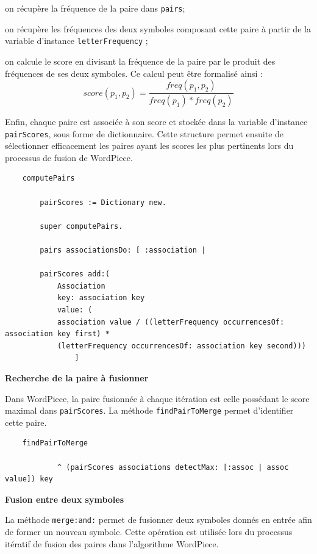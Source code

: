 \documentclass[12pt,a4paper]{report}
\begin{document}
	\begin{itemizeFB}
		\item on récupère la fréquence de la paire dans \texttt{pairs};
		\item on récupère les fréquences des deux symboles composant cette paire à partir de la variable d’instance \texttt{letterFrequency} ;
		\item on calcule le score en divisant la fréquence de la paire par le produit des fréquences de ses deux symboles.
		Ce calcul peut être formalisé ainsi :
		\[
		score(p_1, p_2)=\frac{freq(p_1, p_2)}{freq(p_1) * freq(p_2)}
		\]
	\end{itemizeFB}
	
	Enfin, chaque paire est associée à son score et stockée dans la variable d’instance \texttt{pairScores}, sous forme de dictionnaire. Cette structure permet ensuite de sélectionner efficacement les paires ayant les scores les plus pertinents lors du processus de fusion de WordPiece.
	
	\begin{verbatim}
	computePairs
		
		pairScores := Dictionary new.
				
		super computePairs.
				
		pairs associationsDo: [ :association |
				
		pairScores add:(
			Association 
			key: association key 
			value: (
			association value / ((letterFrequency occurrencesOf: association key first) *
			(letterFrequency occurrencesOf: association key second)))
				]
	\end{verbatim}
	
	\textbf{Recherche de la paire à fusionner}
	
	Dans WordPiece, la paire fusionnée à chaque itération est celle possédant le score maximal dans \texttt{pairScores}. La méthode \texttt{findPairToMerge} permet d’identifier cette paire.
	
	\begin{verbatim}
	findPairToMerge 

			^ (pairScores associations detectMax: [:assoc | assoc value]) key 
	\end{verbatim}
	
	\textbf{Fusion entre deux symboles}
	
	La méthode \texttt{merge:and:} permet de fusionner deux symboles donnés en entrée afin de former un nouveau symbole. Cette opération est utilisée lors du processus itératif de fusion des paires dans l’algorithme WordPiece.
	
\end{document}
